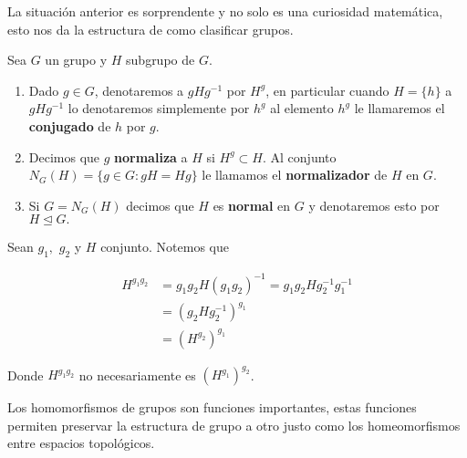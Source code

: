 La situación anterior es sorprendente y no solo es una curiosidad matemática, esto nos da la estructura de como clasificar grupos. 
	
\begin{df}
Sea $G$ un grupo y $H$ subgrupo de $G$.
	
\begin{enumerate}
    \item Dado $g \in G$, denotaremos a $gHg^{-1}$ por $H^g$, en particular cuando $H=\{h\}$ a $gHg^{-1}$ lo denotaremos simplemente por  $h^g$ al elemento $h^{g}$ le llamaremos el \textbf{conjugado} de $h$ por $g$. 
	\item  Decimos que $g$ \textbf{normaliza} a $H$ si $H^{g} \subset H.$ Al conjunto $N_G(H)=\{g \in G: gH=Hg\}$ le llamamos el \textbf{normalizador} de $H$ en $G$.
	\item Si $G=N_G(H)$ decimos que $H$ es \textbf{normal} en $G$ y denotaremos esto por $H \unlhd G.$
		
\end{enumerate}
\end{df}
	
\begin{ob}
Sean $g_1,$ $g_2 $ y $H$ conjunto. Notemos que

\begin{align*}
H^{g_1g_2} &=g_1g_2H(g_1g_2)^{-1}=g_1g_2Hg_2^{-1}g_1^{-1}\\
&=(g_2Hg_2^{-1})^{g_1} \\
& = (H^{g_2})^{g_1}
\end{align*}

Donde $H^{g_1g_2}$ no necesariamente es $(H^{g_1})^{g_2}$.
\end{ob}


Los homomorfismos de grupos son funciones importantes, estas funciones permiten preservar la estructura de grupo a otro justo como los homeomorfismos entre espacios topológicos.
	
